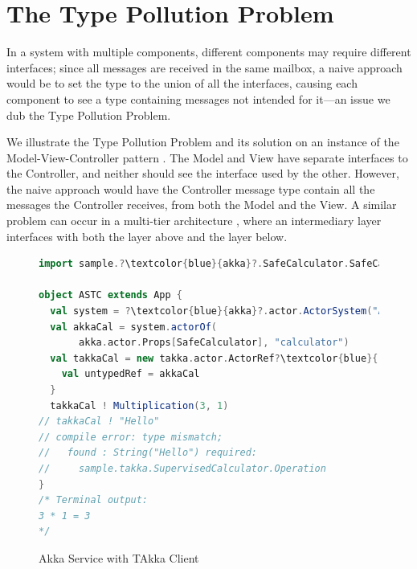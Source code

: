 \section{The Type Pollution Problem}
\label{type_pollution}


In a system with multiple components, different components may require
different interfaces; since all messages are received in the same
mailbox, a naive approach would be to set the type to the union of all
the interfaces, causing each component to see a type containing
messages not intended for it---an issue we dub the Type Pollution
Problem.

We illustrate the Type Pollution Problem and its solution on an
instance of the Model-View-Controller pattern \cite{burbeck87}.  The Model
and View have separate interfaces to the Controller, and neither
should see the interface used by the other.  However, the naive
approach would have the Controller message type contain all the
messages the Controller receives, from both the Model and the View.
A similar problem can occur in a multi-tier architecture \cite{fowler2002patterns},
where an intermediary layer interfaces with both the layer above
and the layer below.

\begin{figure}[t]
      \begin{lstlisting}[language=scala, escapechar=?]
import sample.?\textcolor{blue}{akka}?.SafeCalculator.SafeCalculator   

object ASTC extends App {
  val system = ?\textcolor{blue}{akka}?.actor.ActorSystem("AkkaSystem")
  val akkaCal = system.actorOf(
       akka.actor.Props[SafeCalculator], "calculator")
  val takkaCal = new takka.actor.ActorRef?\textcolor{blue}{[Operation]}?{
    val untypedRef = akkaCal
  }
  takkaCal ! Multiplication(3, 1)
// takkaCal ! "Hello" 
// compile error: type mismatch; 
//   found : String("Hello") required: 
//     sample.takka.SupervisedCalculator.Operation
}
/* Terminal output:
3 * 1 = 3
*/
    \end{lstlisting}
    \caption{Akka Service with TAkka Client}
\label{akkaINtakka}    
\vspace{-20pt }
\end{figure}



